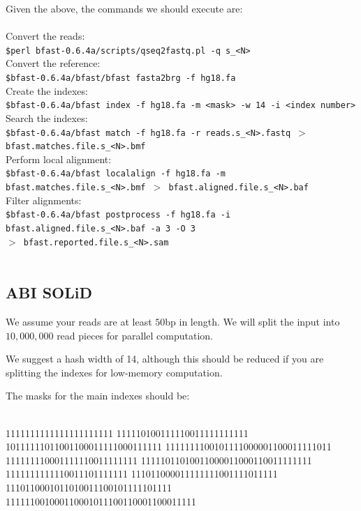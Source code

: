 \documentclass[a4paper,12pt]{book}
\newcommand{\Version}{0.6.4a}
\begin{document}
Given the above, the commands we should execute are:
\\\\
Convert the reads:\\
{\tt \scriptsize \$perl bfast-\Version{}/scripts/qseq2fastq.pl -q s\_<N>\\}
Convert the reference:\\
{\tt \scriptsize \$bfast-\Version{}/bfast/bfast fasta2brg -f hg18.fa\\}
Create the indexes:\\
{\tt \scriptsize \$bfast-\Version{}/bfast index -f hg18.fa -m <mask> -w 14 -i <index number>\\}
Search the indexes:\\
{\tt \scriptsize \$bfast-\Version{}/bfast match -f hg18.fa -r reads.s\_<N>.fastq $>$ bfast.matches.file.s\_<N>.bmf\\}
Perform local alignment:\\
{\tt \scriptsize \$bfast-\Version{}/bfast localalign -f hg18.fa -m bfast.matches.file.s\_<N>.bmf $>$ bfast.aligned.file.s\_<N>.baf\\}
Filter alignments:\\
{\tt \scriptsize \$bfast-\Version{}/bfast postprocess -f hg18.fa -i bfast.aligned.file.s\_<N>.baf -a 3 -O 3 \\
$>$ bfast.reported.file.s\_<N>.sam\\}
\\

\subsection{ABI SOLiD}
\label{sec:hg-settings-abi}
We assume your reads are at least $50$bp in length.
We will split the input into $10,000,000$ read pieces for parallel computation.

We suggest a hash width of 14, although this should be reduced if you are splitting the indexes for low-memory computation.

The masks for the main indexes should be:\\
\\
\begin{boxedverbatim}
1111111111111111111111
111110100111110011111111111
10111111011001100011111000111111
1111111100101111000001100011111011
111111110001111110011111111
11111011010011000011000110011111111
1111111111110011101111111
111011000011111111001111011111
1110110001011010011100101111101111
111111001000110001011100110001100011111
\end{boxedverbatim}
\\
\end{document}

